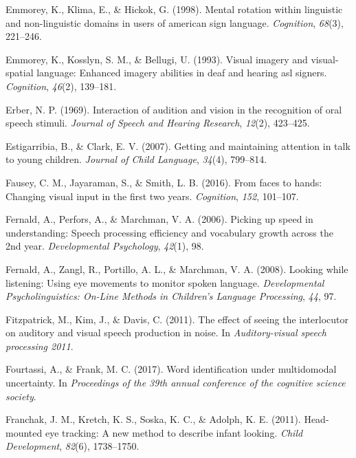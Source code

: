 \documentclass[english,floatsintext,man]{apa6}
\begin{document}
\leavevmode\hypertarget{ref-emmorey1998mental}{}%
Emmorey, K., Klima, E., \& Hickok, G. (1998). Mental rotation within
linguistic and non-linguistic domains in users of american sign
language. \emph{Cognition}, \emph{68}(3), 221--246.

\leavevmode\hypertarget{ref-emmorey1993visual}{}%
Emmorey, K., Kosslyn, S. M., \& Bellugi, U. (1993). Visual imagery and
visual-spatial language: Enhanced imagery abilities in deaf and hearing
asl signers. \emph{Cognition}, \emph{46}(2), 139--181.

\leavevmode\hypertarget{ref-erber1969interaction}{}%
Erber, N. P. (1969). Interaction of audition and vision in the
recognition of oral speech stimuli. \emph{Journal of Speech and Hearing
Research}, \emph{12}(2), 423--425.

\leavevmode\hypertarget{ref-estigarribia2007getting}{}%
Estigarribia, B., \& Clark, E. V. (2007). Getting and maintaining
attention in talk to young children. \emph{Journal of Child Language},
\emph{34}(4), 799--814.

\leavevmode\hypertarget{ref-fausey2016faces}{}%
Fausey, C. M., Jayaraman, S., \& Smith, L. B. (2016). From faces to
hands: Changing visual input in the first two years. \emph{Cognition},
\emph{152}, 101--107.

\leavevmode\hypertarget{ref-fernald2006picking}{}%
Fernald, A., Perfors, A., \& Marchman, V. A. (2006). Picking up speed in
understanding: Speech processing efficiency and vocabulary growth across
the 2nd year. \emph{Developmental Psychology}, \emph{42}(1), 98.

\leavevmode\hypertarget{ref-fernald2008looking}{}%
Fernald, A., Zangl, R., Portillo, A. L., \& Marchman, V. A. (2008).
Looking while listening: Using eye movements to monitor spoken language.
\emph{Developmental Psycholinguistics: On-Line Methods in Children's
Language Processing}, \emph{44}, 97.

\leavevmode\hypertarget{ref-fitzpatrick2011effect}{}%
Fitzpatrick, M., Kim, J., \& Davis, C. (2011). The effect of seeing the
interlocutor on auditory and visual speech production in noise. In
\emph{Auditory-visual speech processing 2011}.

\leavevmode\hypertarget{ref-fourtassiword2018}{}%
Fourtassi, A., \& Frank, M. C. (2017). Word identification under
multidomodal uncertainty. In \emph{Proceedings of the 39th annual
conference of the cognitive science society}.

\leavevmode\hypertarget{ref-franchak2011head}{}%
Franchak, J. M., Kretch, K. S., Soska, K. C., \& Adolph, K. E. (2011).
Head-mounted eye tracking: A new method to describe infant looking.
\emph{Child Development}, \emph{82}(6), 1738--1750.
\end{document}
